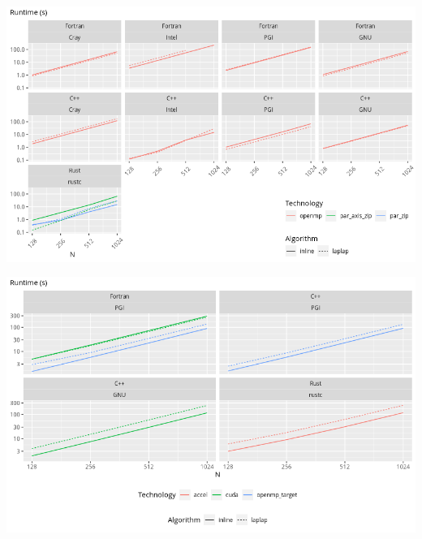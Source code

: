 \documentclass[aspectratio=43, t]{beamer}
\begin{document}
\begin{frame}
	\centering
	\includegraphics[width = \textwidth, height = \textheight, keepaspectratio]{scaling_cpu.png}
	\par
\end{frame}

\begin{frame}
	\centering
	\includegraphics[width = \textwidth, height = \textheight, keepaspectratio]{scaling_gpu.png}
	\par
\end{frame}
\end{document}
